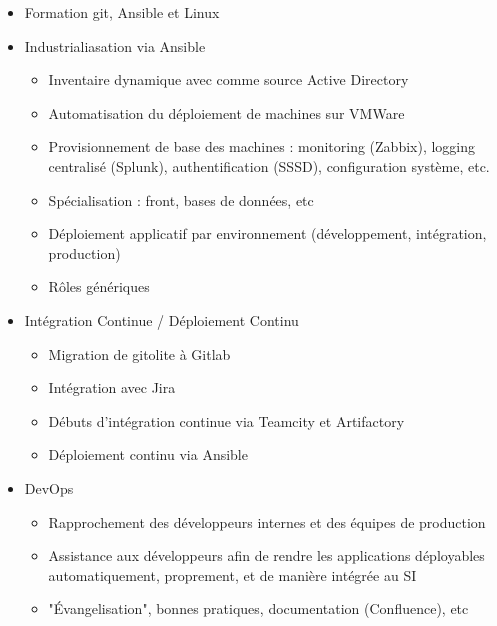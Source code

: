\documentclass[10pt,a4paper]{moderncv}
\begin{document}
{
  \begin{itemize}
    \item Formation git, Ansible et Linux
    \item Industrialiasation via Ansible
      \begin{itemize}
        \item Inventaire dynamique avec comme source Active Directory
        \item Automatisation du déploiement de machines sur VMWare
        \item Provisionnement de base des machines : monitoring (Zabbix),
          logging centralisé (Splunk), authentification (SSSD), configuration
          système, etc.
        \item Spécialisation : front, bases de données, etc
        \item Déploiement applicatif par environnement (développement,
          intégration, production)
        \item Rôles génériques
      \end{itemize}
    \item Intégration Continue / Déploiement Continu
      \begin{itemize}
        \item Migration de gitolite à Gitlab
        \item Intégration avec Jira
        \item Débuts d'intégration continue via Teamcity et Artifactory
        \item Déploiement continu via Ansible
      \end{itemize}
    \item DevOps
      \begin{itemize}
        \item Rapprochement des développeurs internes et des équipes de
          production
        \item Assistance aux développeurs afin de rendre les applications
          déployables automatiquement, proprement, et de manière intégrée au SI
        \item "\'{E}vangelisation", bonnes pratiques, documentation
          (Confluence), etc
      \end{itemize}
  \end{itemize}
}
\end{document}
